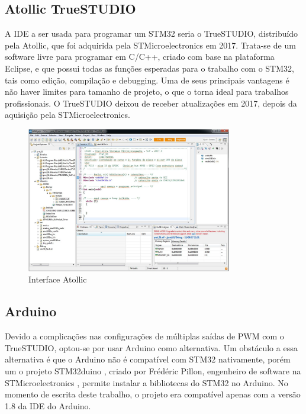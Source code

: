 
\subsection{Atollic TrueSTUDIO}

A IDE a ser usada para programar um STM32 seria o TrueSTUDIO, distribuído pela
Atollic, que foi adquirida pela STMicroelectronics em 2017. Trata-se de um
software livre para programar em C/C++, criado com base na plataforma Eclipse,
e que possui todas as funções esperadas para o trabalho com o STM32, tais como
edição, compilação e debugging. Uma de seus principais vantagens é não haver
limites para tamanho de projeto, o que o torna ideal para trabalhos
profissionais. O TrueSTUDIO deixou de receber atualizações em 2017,
depois da aquisição pela STMicroelectronics.\cite{apostila_microprossados}

\begin{figure}[ht]
	\centering
	\includegraphics[width=0.8\textwidth]{figures/atollic}
	\caption{Interface Atollic \cite{apostila_microprossados}}
\end{figure}


\subsection{Arduino}
Devido a complicações nas configurações de múltiplas saídas de PWM com o
TrueSTUDIO, optou-se por usar Arduino como alternativa. Um obstáculo a essa
alternativa é que o Arduino não é compatível com STM32 nativamente, porém um
o projeto STM32duino \cite{STM32duino}, criado por Frédéric Pillon, engenheiro
de software na STMicroelectronics \cite{fpistm}, permite instalar a bibliotecas
do STM32 no Arduino. No momento de escrita deste trabalho, o projeto era
compatível apenas com a versão 1.8 da IDE do Arduino.


